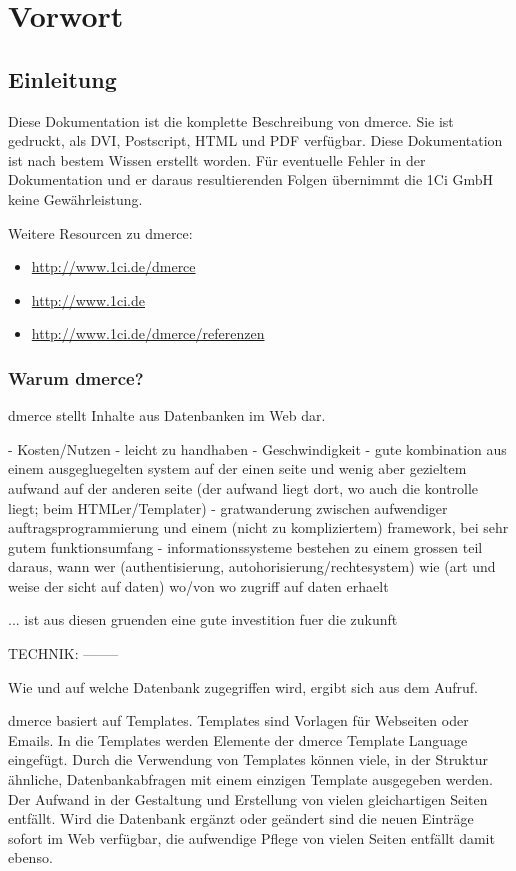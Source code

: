 \part{Vorwort}

\chapter{Einleitung}

Diese Dokumentation ist die komplette Beschreibung von dmerce. Sie ist
gedruckt, als DVI, Postscript, HTML und PDF verf\"{u}gbar. Diese
Dokumentation ist nach bestem Wissen erstellt worden. F\"{u}r
eventuelle Fehler in der Dokumentation und er daraus resultierenden
Folgen \"{u}bernimmt die 1Ci GmbH keine Gew\"{a}hrleistung.

Weitere Resourcen zu dmerce:

\begin{itemize}
\item \href{dmerce}{http://www.1ci.de/dmerce}
\item \href{1Ci}{http://www.1ci.de}
\item \href{dmerce-ref}{http://www.1ci.de/dmerce/referenzen}
\end{itemize}

\section{Warum dmerce?}

dmerce stellt Inhalte aus Datenbanken im Web dar.

- Kosten/Nutzen
- leicht zu handhaben
- Geschwindigkeit
- gute kombination aus einem ausgegluegelten system auf der einen seite und wenig
  aber gezieltem aufwand auf der anderen seite (der aufwand liegt dort, wo auch
  die kontrolle liegt; beim HTMLer/Templater)
- gratwanderung zwischen aufwendiger auftragsprogrammierung und einem (nicht zu 
  kompliziertem) framework, bei sehr gutem funktionsumfang
- informationssysteme bestehen zu einem grossen teil daraus, wann wer (authentisierung,
  autohorisierung/rechtesystem) wie (art und weise der sicht auf daten) wo/von wo zugriff
  auf daten erhaelt

... ist aus diesen gruenden eine gute investition fuer die zukunft

TECHNIK:
--------

 Wie und auf welche Datenbank
zugegriffen wird, ergibt sich aus dem Aufruf.

dmerce basiert auf Templates.
Templates sind Vorlagen f\"{u}r Webseiten oder Emails. In die Templates werden
Elemente der dmerce Template Language eingef\"{u}gt. Durch die Verwendung von
Templates k\"{o}nnen viele, in der Struktur \"{a}hnliche, Datenbankabfragen
mit einem einzigen Template ausgegeben werden. Der Aufwand in der Gestaltung
und Erstellung von vielen gleichartigen Seiten entf\"{a}llt. Wird die Datenbank
erg\"{a}nzt oder ge\"{a}ndert sind die neuen Eintr\"{a}ge sofort im Web verf\"{u}gbar,
die aufwendige Pflege von vielen Seiten entf\"{a}llt damit ebenso.

